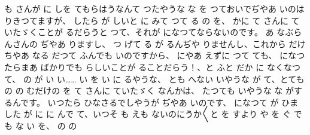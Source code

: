 も
さんが
に
しを
てもらはうなんて
つたやうな
な
を
つておいでぢやあ
いのは
りきつてますが、
したら
が
しいと
に
みて
つて
る
の
を、
かに
て
さんに
ていたゞくことが
るだらうと
つて、それが
になつてならないのです。
あ
なぶらんさんの
ぢやあ
りますし、
つ
げて
る
が
るんぢや
りませんし、これから
だけ
ちやあ
なる
だつて
ふんでも
いのですから、
にやあ
えずに
つて
ても、
になつたらまあ
ばかりでも
らしいことが
ることだらう！、と
ふと
だか
に
なくなつて、
の
が
い
い……
い
を
い
に
るやうな、
とも
へない
いやうな
が
て、とても
の
の
むだけの
を
て
さんに
ていたゞく
なんかは、
たつても
いやうな
な
がするんです。
いつたら
ひなさるでしやうが
ぢやあ
いのです、
になつて
が
ひました
が
に
に
んで
て、いつそ
も
えも
ないのにうか〳〵と
を
すより
や
を
ぐ
でも
な
い
を、
の
の
